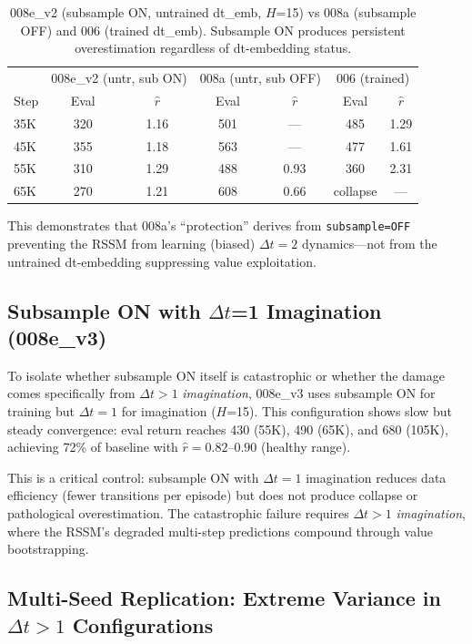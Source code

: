 \documentclass[10pt,letterpaper]{article}
\newcommand{\dt}{\Delta t}
\begin{document}
\begin{table}[t]
\centering
\caption{008e\_v2 (subsample ON, untrained dt\_emb, $H$=15) vs 008a (subsample OFF) and 006 (trained dt\_emb). Subsample ON produces persistent overestimation regardless of dt-embedding status.}
\label{tab:008e_v2}
\small
\begin{tabular}{l cc cc cc}
\toprule
& \multicolumn{2}{c}{008e\_v2 (untr, sub ON)} & \multicolumn{2}{c}{008a (untr, sub OFF)} & \multicolumn{2}{c}{006 (trained)} \\
Step & Eval & $\hat{r}$ & Eval & $\hat{r}$ & Eval & $\hat{r}$ \\
\midrule
35K & 320 & 1.16 & 501 & --- & 485 & 1.29 \\
45K & 355 & 1.18 & 563 & --- & 477 & 1.61 \\
55K & 310 & 1.29 & 488 & 0.93 & 360 & 2.31 \\
65K & 270 & 1.21 & 608 & 0.66 & collapse & --- \\
\bottomrule
\end{tabular}
\end{table}

This demonstrates that 008a's ``protection'' derives from \texttt{subsample=OFF} preventing the RSSM from learning (biased) $\dt=2$ dynamics---not from the untrained dt-embedding suppressing value exploitation.

\subsection{Subsample ON with $\dt$=1 Imagination (008e\_v3)}\label{sec:008e_v3}

To isolate whether subsample ON itself is catastrophic or whether the damage comes specifically from $\dt>1$ \emph{imagination}, 008e\_v3 uses subsample ON for training but $\dt=1$ for imagination ($H$=15).
This configuration shows slow but steady convergence: eval return reaches 430 (55K), 490 (65K), and 680 (105K), achieving 72\% of baseline with $\hat{r} = 0.82$--$0.90$ (healthy range).

This is a critical control: subsample ON with $\dt=1$ imagination reduces data efficiency (fewer transitions per episode) but does not produce collapse or pathological overestimation.
The catastrophic failure requires $\dt>1$ \emph{imagination}, where the RSSM's degraded multi-step predictions compound through value bootstrapping.

\subsection{Multi-Seed Replication: Extreme Variance in $\dt>1$ Configurations}\label{sec:multiseed}
\end{document}
